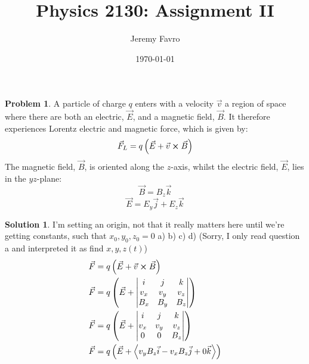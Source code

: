 \documentclass[10pt]{article}
\title{Physics 2130: Assignment II}
\author{Jeremy Favro}
\date{\today}
\theoremstyle{definition}
\newtheorem{problem}{Problem}
\newtheorem{soln}{Solution}
\begin{document}
\maketitle

\begin{problem}
A particle of charge $q$ enters with a velocity $\vec{v}$ a region of space where there are both an electric, $\vec{E}$, and a magnetic field, $\vec{B}$.
It therefore experiences Lorentz electric and magnetic force, which is given by:
$$\vec{F}_L=q\left(\vec{E}+\vec{v}\cross\vec{B}\right)$$
The magnetic field, $\vec{B}$, is oriented along the $z$-axis, whilst the electric field, $\vec{E}$, lies in the $yz$-plane:
$$\vec{B}=B_z\vec{k}$$
$$\vec{E}=E_y\vec{j}+E_z\vec{k}$$
\end{problem}
\begin{soln} I'm setting an origin, not that it really matters here until we're getting constants, such that $x_0,y_0,z_0=0$
      a) b) c) d) (Sorry, I only read question a and interpreted it as find $x,y,z(t)$)
      \begin{align*}
             & \vec{F} = q\left(\vec{E}+\vec{v}\cross\vec{B}\right)                                               \\
             & \vec{F} = q\left(\vec{E}+               \begin{vmatrix}
                                                             i   & j   & k   \\
                                                             v_x & v_y & v_z \\
                                                             B_x & B_y & B_z
                                                       \end{vmatrix}\right)                                       \\
             & \vec{F} = q\left(\vec{E}+\begin{vmatrix}
                                              i   & j   & k   \\
                                              v_x & v_y & v_z \\
                                              0   & 0   & B_z
                                        \end{vmatrix}\right)                                                      \\
             & \vec{F} = q\left(\vec{E}+\left\langle v_yB_z\vec{i}-v_xB_z\vec{j} + 0\vec{k} \right\rangle \right)
      \end{align*}

\end{soln}
\end{document}
